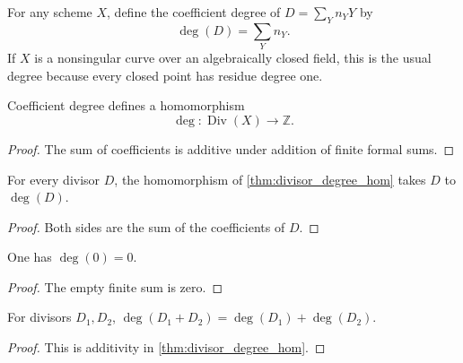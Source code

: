 \begin{definition}
  \label{def:divisor_degree}
  \leanok

  For any scheme \(X\), define the coefficient degree of
  \(D=\sum_Y n_YY\) by
  \[
    \deg(D)=\sum_Y n_Y.
  \]
  If \(X\) is a nonsingular curve over an algebraically closed field, this
  is the usual degree because every closed point has residue degree one.
\end{definition}

\begin{theorem}
  \label{thm:divisor_degree_hom}
  \leanok

  Coefficient degree defines a homomorphism
  \[
    \deg\colon\operatorname{Div}(X)\longrightarrow\mathbb Z.
  \]
\end{theorem}
\begin{proof}
  \leanok
  The sum of coefficients is additive under addition of finite formal sums.
\end{proof}

\begin{lemma}
  \label{lem:degree_hom_apply}
  \leanok
  For every divisor \(D\), the homomorphism of
  \cref{thm:divisor_degree_hom} takes \(D\) to \(\deg(D)\).
\end{lemma}
\begin{proof}
  \leanok
  Both sides are the sum of the coefficients of \(D\).
\end{proof}

\begin{lemma}
  \label{lem:degree_zero}
  \leanok
  One has \(\deg(0)=0\).
\end{lemma}
\begin{proof}
  \leanok
  The empty finite sum is zero.
\end{proof}

\begin{lemma}
  \label{lem:degree_add}
  \leanok
  For divisors \(D_1,D_2\),
  \(\deg(D_1+D_2)=\deg(D_1)+\deg(D_2)\).
\end{lemma}
\begin{proof}
  \leanok
  This is additivity in \cref{thm:divisor_degree_hom}.
\end{proof}

